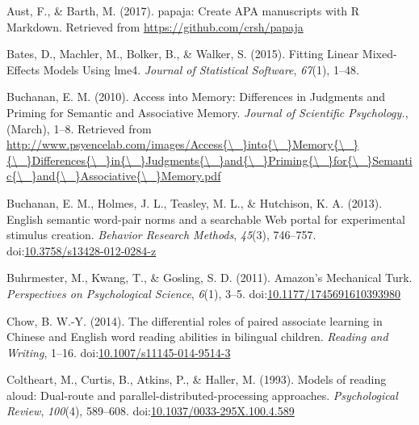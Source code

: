 \documentclass[english,man]{apa6}
\theoremstyle{definition}
\theoremstyle{definition}
\theoremstyle{definition}
\theoremstyle{remark}
\begin{document}
\setlength{\parindent}{-0.5in} \setlength{\leftskip}{0.5in}

\hypertarget{refs}{}
\hypertarget{ref-Aust2017}{}
Aust, F., \& Barth, M. (2017). papaja: Create APA manuscripts with R
Markdown. Retrieved from \url{https://github.com/crsh/papaja}

\hypertarget{ref-Bates2015}{}
Bates, D., Machler, M., Bolker, B., \& Walker, S. (2015). Fitting Linear
Mixed-Effects Models Using lme4. \emph{Journal of Statistical Software},
\emph{67}(1), 1--48.

\hypertarget{ref-Buchanan2010}{}
Buchanan, E. M. (2010). Access into Memory: Differences in Judgments and
Priming for Semantic and Associative Memory. \emph{Journal of Scientific
Psychology.}, (March), 1--8. Retrieved from
\href{http://www.psyencelab.com/images/Access\%7B/_\%7Dinto\%7B/_\%7DMemory\%7B/_\%7D\%7B/_\%7DDifferences\%7B/_\%7Din\%7B/_\%7DJudgments\%7B/_\%7Dand\%7B/_\%7DPriming\%7B/_\%7Dfor\%7B/_\%7DSemantic\%7B/_\%7Dand\%7B/_\%7DAssociative\%7B/_\%7DMemory.pdf}{http://www.psyencelab.com/images/Access\{\textbackslash{}\_\}into\{\textbackslash{}\_\}Memory\{\textbackslash{}\_\}\{\textbackslash{}\_\}Differences\{\textbackslash{}\_\}in\{\textbackslash{}\_\}Judgments\{\textbackslash{}\_\}and\{\textbackslash{}\_\}Priming\{\textbackslash{}\_\}for\{\textbackslash{}\_\}Semantic\{\textbackslash{}\_\}and\{\textbackslash{}\_\}Associative\{\textbackslash{}\_\}Memory.pdf}

\hypertarget{ref-Buchanan2013}{}
Buchanan, E. M., Holmes, J. L., Teasley, M. L., \& Hutchison, K. A.
(2013). English semantic word-pair norms and a searchable Web portal for
experimental stimulus creation. \emph{Behavior Research Methods},
\emph{45}(3), 746--757.
doi:\href{https://doi.org/10.3758/s13428-012-0284-z}{10.3758/s13428-012-0284-z}

\hypertarget{ref-Buhrmester2011}{}
Buhrmester, M., Kwang, T., \& Gosling, S. D. (2011). Amazon's Mechanical
Turk. \emph{Perspectives on Psychological Science}, \emph{6}(1), 3--5.
doi:\href{https://doi.org/10.1177/1745691610393980}{10.1177/1745691610393980}

\hypertarget{ref-Chow2014}{}
Chow, B. W.-Y. (2014). The differential roles of paired associate
learning in Chinese and English word reading abilities in bilingual
children. \emph{Reading and Writing}, 1--16.
doi:\href{https://doi.org/10.1007/s11145-014-9514-3}{10.1007/s11145-014-9514-3}

\hypertarget{ref-Coltheart1993}{}
Coltheart, M., Curtis, B., Atkins, P., \& Haller, M. (1993). Models of
reading aloud: Dual-route and parallel-distributed-processing
approaches. \emph{Psychological Review}, \emph{100}(4), 589--608.
doi:\href{https://doi.org/10.1037/0033-295X.100.4.589}{10.1037/0033-295X.100.4.589}
\end{document}
